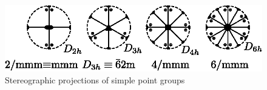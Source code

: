 \begin{figure}[H]
\bigskip

\includegraphics{images/lecture10/fig12.eps}

\caption{Stereographic projections of simple point groups}
\end{figure}



 



